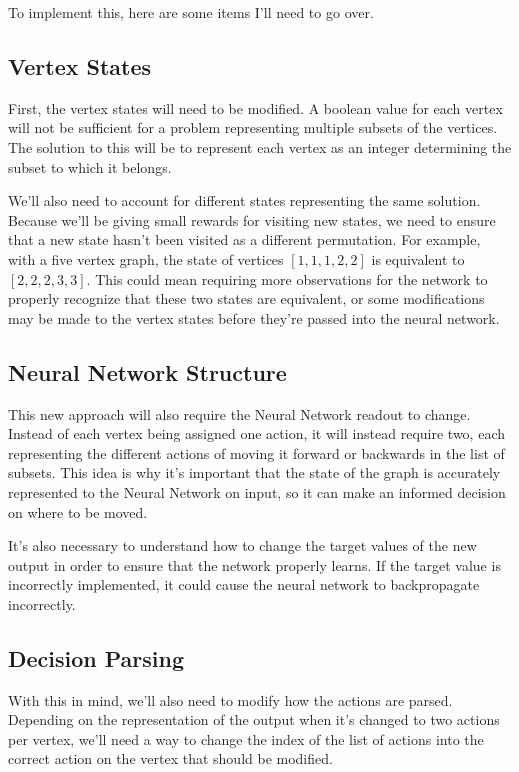 \documentclass{article}
\begin{document}
To implement this, here are some items I'll need to go over.

\subsection{Vertex States}

First, the vertex states will need to be modified. A boolean value for each vertex will not be sufficient for a problem representing multiple subsets of the vertices. The solution to this will be to represent each vertex as an integer determining the subset to which it belongs. 

We'll also need to account for different states representing the same solution. Because we'll be giving small rewards for visiting new states, we need to ensure that a new state hasn't been visited as a different permutation. For example, with a five vertex graph, the state of vertices $[1, 1, 1, 2, 2]$ is equivalent to $[2, 2, 2, 3, 3]$. This could mean requiring more observations for the network to properly recognize that these two states are equivalent, or some modifications may be made to the vertex states before they're passed into the neural network. 

\subsection{Neural Network Structure}

This new approach will also require the Neural Network readout to change. Instead of each vertex being assigned one action, it will instead require two, each representing the different actions of moving it forward or backwards in the list of subsets. This idea is why it's important that the state of the graph is accurately represented to the Neural Network on input, so it can make an informed decision on where to be moved.

It's also necessary to understand how to change the target values of the new output in order to ensure that the network properly learns. If the target value is incorrectly implemented, it could cause the neural network to backpropagate incorrectly.

\subsection{Decision Parsing}

With this in mind, we'll also need to modify how the actions are parsed. Depending on the representation of the output when it's changed to two actions per vertex, we'll need a way to change the index of the list of actions into the correct action on the vertex that should be modified.
\end{document}
